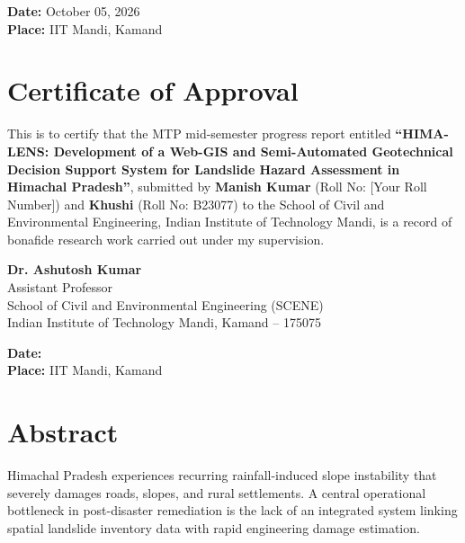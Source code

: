 \documentclass[12pt,a4paper]{report}
\begin{document}
\vspace{1.5cm}
\noindent \textbf{Date:} October 05, 2026\\
\noindent \textbf{Place:} IIT Mandi, Kamand

\newpage

\chapter*{Certificate of Approval}

This is to certify that the MTP mid-semester progress report entitled \textbf{``HIMA-LENS: Development of a Web-GIS and Semi-Automated Geotechnical Decision Support System for Landslide Hazard Assessment in Himachal Pradesh''}, submitted by \textbf{Manish Kumar} (Roll No: [Your Roll Number]) and \textbf{Khushi} (Roll No: B23077) to the School of Civil and Environmental Engineering, Indian Institute of Technology Mandi, is a record of bonafide research work carried out under my supervision.

\vspace{3.5cm}

\noindent
\textbf{Dr. Ashutosh Kumar}\\
Assistant Professor\\
School of Civil and Environmental Engineering (SCENE)\\
Indian Institute of Technology Mandi, Kamand -- 175075

\vspace{1.5cm}
\noindent \textbf{Date:}\dotfill\\
\noindent \textbf{Place:} IIT Mandi, Kamand

\newpage

\chapter*{Abstract}

Himachal Pradesh experiences recurring rainfall-induced slope instability that severely damages roads, slopes, and rural settlements. A central operational bottleneck in post-disaster remediation is the lack of an integrated system linking spatial landslide inventory data with rapid engineering damage estimation.
\end{document}
